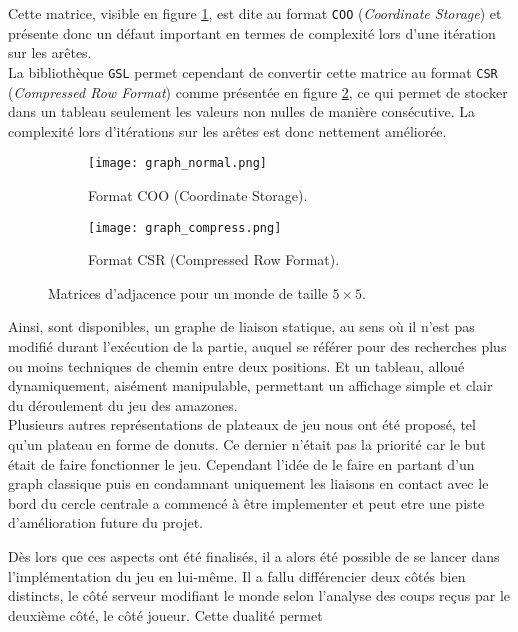 \medbreak
Cette matrice, visible en figure \ref{subfig:graphe_normal}, est dite au format \texttt{COO} (\textit{Coordinate Storage}) et présente donc un défaut important en termes de complexité lors d'une itération sur les arêtes. \\
La bibliothèque \texttt{GSL} permet cependant de convertir cette matrice au format \texttt{CSR} (\textit{Compressed Row Format}) comme présentée en figure \ref{subfig:graphe_compresse}, ce qui permet de stocker dans un tableau seulement les valeurs non nulles de manière consécutive. La complexité lors d'itérations sur les arêtes est donc nettement améliorée.

\begin{figure}[H]
    \centering
    \begin{subfigure}{0.5\textwidth}
        \centering
        \texttt{[image: graph\_normal.png]}
        \caption{Format COO (Coordinate Storage).}
        \label{subfig:graphe_normal}
    \end{subfigure}
    \hspace{1cm}
    \begin{subfigure}{0.4\textwidth}
        \centering
        \texttt{[image: graph\_compress.png]}
        \caption{Format CSR (Compressed Row Format).}
        \label{subfig:graphe_compresse}
    \end{subfigure}
    \caption{Matrices d'adjacence pour un monde de taille $5\times5$.\protect\footnotemark} 
    \label{fig:matrices_d_adjacence}
\end{figure} \medbreak
{}

Ainsi, sont disponibles, un graphe de liaison statique, au sens où il n'est pas modifié durant l'exécution de la partie, auquel se référer pour des recherches plus ou moins techniques de chemin entre deux positions. Et un tableau, alloué dynamiquement, aisément manipulable, permettant un affichage simple et clair du déroulement du jeu des amazones.\\
Plusieurs autres représentations de plateaux de jeu nous ont été proposé, tel qu'un plateau en forme de donuts. Ce dernier n'était pas la priorité car le but était de faire fonctionner le jeu. Cependant l'idée de le faire en partant d'un graph classique puis en condamnant uniquement les liaisons en contact avec le bord du cercle centrale a commencé à être implementer et peut etre une piste d'amélioration future du projet.


\medbreak

Dès lors que ces aspects ont été finalisés, il a alors été possible de se lancer dans l'implémentation du jeu en lui-même. Il a fallu différencier deux côtés bien distincts, le côté serveur modifiant le monde selon l'analyse des coups reçus par le deuxième côté, le côté joueur. Cette dualité permet 